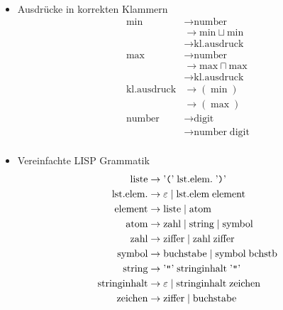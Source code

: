 \begin{itemize}
\begin{align*}
        \end{align*}
    \item Ausdrücke in korrekten Klammern
        \begin{align*}
            \text{min}&\rightarrow \text{number}\\
            &\rightarrow \text{min}\sqcup \text{min}\\
            &\rightarrow\text{kl.ausdruck}\\
            \text{max}&\rightarrow \text{number}\\
            &\rightarrow \text{max}\sqcap \text{max}\\
            &\rightarrow\text{kl.ausdruck}\\
            \text{kl.ausdruck}&\rightarrow (\;\text{min}\;)\\
            &\rightarrow (\;\text{max}\;)\\
            \text{number}&\rightarrow\text{digit}\\
            &\rightarrow\text{number}\;\text{digit}\\
        \end{align*}
    \item Vereinfachte LISP Grammatik
    \begin{align*}
        \text{liste}&\rightarrow {
        {\text{'{\tt (}'}}\;
        \text{lst.elem.}\;
        {\text{'{\tt )}'}}}
        \\
        \text{lst.elem.}&\rightarrow {\varepsilon} \;|\; \text{lst.elem}\;\text{element}
        \\
        \text{element}&\rightarrow {\text{liste}} \;|\; {\text{atom}}
        \\
        \text{atom}&\rightarrow {\text{zahl}}\;|\;{\text{string}}\;|\;{\text{symbol}}
        \\
        \text{zahl}&\rightarrow {\text{ziffer}}\;|\;\text{zahl}\;\text{ziffer}
        \\
        \text{symbol}&\rightarrow {\text{buchstabe}} \;|\; \text{symbol}\;\text{bchstb}
        \\
        \text{string}&\rightarrow {
        \text{'{\tt\textquotedblright}'}\; \text{stringinhalt}\;
        \text{'{\tt\textquotedblright}'}}
        \\
        \text{stringinhalt}&\rightarrow {\varepsilon} \;|\; \text{stringinhalt}\;\text{zeichen}
        \\
        \text{zeichen}&\rightarrow {\text{ziffer}}\; |\; {\text{buchstabe}}
    \end{align*}

\end{itemize}
